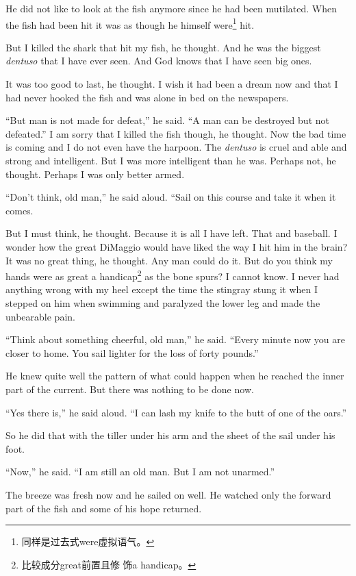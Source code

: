 \documentclass[fontset=ubuntu]{ctexrep}
\begin{document}
He did not like to look at the fish anymore since he had been
\gls{mutilated}. When the fish had been hit it was as though he himself
were\footnote{同样是过去式were虚拟语气。} hit.

But I killed the shark that hit my fish, he thought. And he was the biggest
\emph{dentuso} that I have ever seen. And God knows that I have seen big ones.

It was too good to last, he thought. I wish it had been a dream now and
that I had never hooked the fish and was alone in bed on the newspapers.

``But man is not made for defeat,'' he said. ``A man can be destroyed but
not defeated.'' I am sorry that I killed the fish though, he thought. Now
the bad time is coming and I do not even have the harpoon. The \emph{dentuso} is
cruel and able and strong and intelligent. But I was more intelligent than
he was. Perhaps not, he thought. Perhaps I was only better armed.

``Don't think, old man,'' he said aloud. ``Sail on this course and take it
when it comes.

But I must think, he thought. Because it is all I have left. That and
baseball. I wonder how the great DiMaggio would have liked the way I hit him
in the brain? It was no great thing, he thought. Any man could do it. But do
you think my hands were as great a handicap\footnote{比较成分great前置且修
  饰a handicap。} as the bone spurs? I cannot know. I never had anything
wrong with my heel except the time the \gls{stingray} \gls{stung} it when I
stepped on him when swimming and \gls{paralyzed} the lower leg and made the
\gls{unbearable} pain.

``Think about something cheerful, old man,'' he said. ``Every minute now you
are closer to home. You sail lighter for the loss of forty pounds.''

He knew quite well the \gls{pattern} of what could happen when he reached
the inner part of the current. But there was nothing to be done now.

``Yes there is,'' he said aloud. ``I can lash my knife to the butt of one of
the oars.''

So he did that with the tiller under his arm and the \gls{sheet} of the sail
under his foot.

``Now,'' he said. ``I am still an old man. But I am not unarmed.''

The breeze was fresh now and he sailed on well. He watched only the forward
part of the fish and some of his hope returned.
\end{document}
